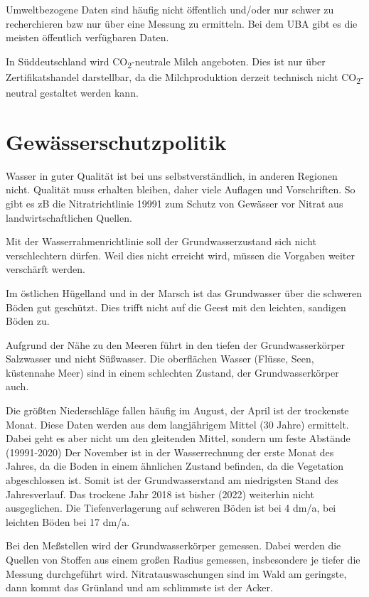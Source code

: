 \documentclass[11pt]{scrbook}
\begin{document}
Umweltbezogene Daten sind häufig nicht öffentlich und/oder nur schwer zu recherchieren bzw nur über eine Messung zu ermitteln.
Bei dem \ac{UBA} gibt es die meisten öffentlich verfügbaren Daten.

In Süddeutschland wird CO\textsubscript{2}-neutrale Milch angeboten.
Dies ist nur über Zertifikatshandel darstellbar, da die Milchproduktion derzeit technisch nicht CO\textsubscript{2}-neutral gestaltet werden kann.

\section{Gewässerschutzpolitik}

Wasser in guter Qualität ist bei uns selbstverständlich, in anderen Regionen nicht.
Qualität muss erhalten bleiben, daher viele Auflagen und Vorschriften.
So gibt es zB die Nitratrichtlinie 19991 zum Schutz von Gewässer vor Nitrat aus landwirtschaftlichen Quellen.

Mit der Wasserrahmenrichtlinie soll der Grundwasserzustand sich nicht verschlechtern dürfen.
Weil dies nicht erreicht wird, müssen die Vorgaben weiter verschärft werden.

Im östlichen Hügelland und in der Marsch ist das Grundwasser über die schweren Böden gut geschützt.
Dies trifft nicht auf die Geest mit den leichten, sandigen Böden zu.

Aufgrund der Nähe zu den Meeren führt in den tiefen der Grundwasserkörper Salzwasser und nicht Süßwasser.
Die oberflächen Wasser (Flüsse, Seen, küstennahe Meer) sind in einem schlechten Zustand, der Grundwasserkörper auch.

Die größten Niederschläge fallen häufig im August, der April ist der trockenste Monat.
Diese Daten werden aus dem langjährigem Mittel (30 Jahre) ermittelt.
Dabei geht es aber nicht um den gleitenden Mittel, sondern um feste Abstände (19991-2020)
Der November ist in der Wasserrechnung der erste Monat des Jahres, da die Boden in einem ähnlichen Zustand befinden, da die Vegetation abgeschlossen ist.
Somit ist der Grundwasserstand am niedrigsten Stand des Jahresverlauf.
Das trockene Jahr 2018 ist bisher (2022) weiterhin nicht ausgeglichen.
Die Tiefenverlagerung auf schweren Böden ist bei 4 dm/a, bei leichten Böden bei 17 dm/a.

Bei den Meßstellen wird der Grundwasserkörper gemessen.
Dabei werden die Quellen von Stoffen aus einem großen Radius gemessen, insbesondere je tiefer die Messung durchgeführt wird.
Nitratauswaschungen sind im Wald am geringste, dann kommt das Grünland und am \glqq schlimmste\grqq{} ist der Acker.
\end{document}

